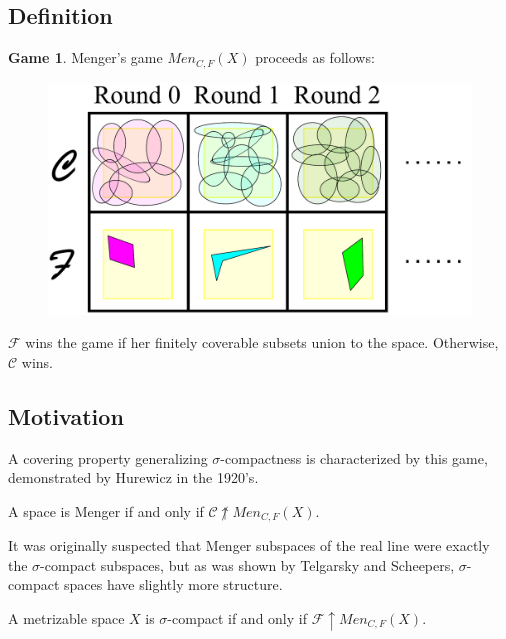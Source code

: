 \documentclass{beamer}
\theoremstyle{definition}
\newtheorem{game}[theorem]{Game}
\newcommand{\win}{\uparrow}
\newcommand{\menGame}[1]{Men_{C,F}\left({#1}\right)}
\newcommand{\<}{\langle}
\renewcommand{\>}{\rangle}
\newcommand{\pl}[1]{\mathscr{#1}}
\begin{document}
\subsection{Definition}

\begin{frame}
  \small
  \begin{game}
  Menger's game $\menGame{X}$ proceeds as follows:
    \begin{figure}
      \includegraphics[width=0.6\linewidth]{mengerGame.pdf}
    \end{figure}

  $\pl F$ wins the game if her finitely coverable subsets
  union to the space. Otherwise, $\pl C$  wins.
  \end{game}
\end{frame}

\subsection{Motivation}

\begin{frame}
  A covering property generalizing $\sigma$-compactness is characterized
  by this game, demonstrated by Hurewicz in the 1920's. \cite{MR1544773}

  \begin{theorem}
    A space is Menger if and only if $\pl C\not\win\menGame{X}$.
  \end{theorem}

  \pause

  It was originally suspected that Menger subspaces of the real line were
  exactly the $\sigma$-compact subspaces, but as was shown by Telgarsky
  and Scheepers, $\sigma$-compact spaces
  have slightly more structure. \cite{MR753073} \cite{MR1273523}

  \begin{theorem}
    A metrizable space $X$ is $\sigma$-compact if and only if
    $\pl F\win\menGame{X}$.
  \end{theorem}
\end{frame}
\end{document}
